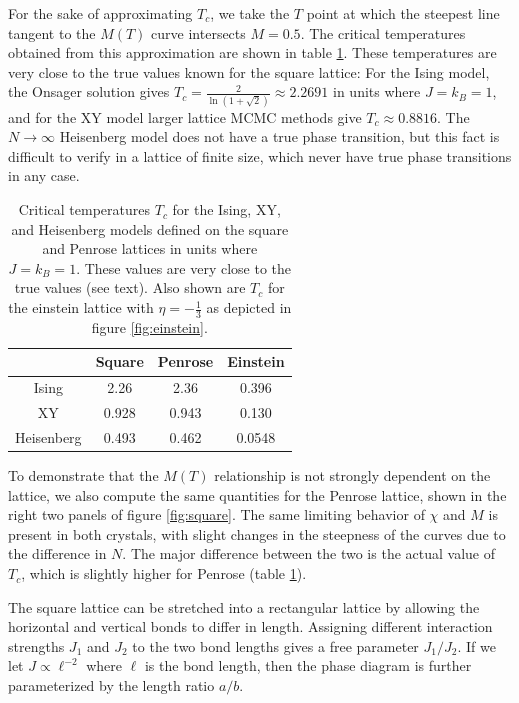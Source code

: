 \documentclass[
  amsmath,
  amssymb,
  aps,
  twocolumn,
  nofootinbib,
  nolongbibliography,
  floatfix,
]{revtex4-2}
\begin{document}
For the sake of approximating $T_c$, we take the $T$ point at which the steepest line tangent to the $M(T)$ curve intersects $M=0.5$. The critical temperatures obtained from this approximation are shown in table \ref{tab:tc}. These temperatures are very close to the true values known for the square lattice: For the Ising model, the Onsager solution gives $T_c = \frac{2}{\ln(1 + \sqrt{2})} \approx 2.2691$ in units where $J=k_B=1$, and for the XY model larger lattice MCMC methods give $T_c \approx 0.8816$. The $N\rightarrow \infty$ Heisenberg model does not have a true phase transition, but this fact is difficult to verify in a lattice of finite size, which never have true phase transitions in any case. 
\begin{table}
  \centering
  \begin{tabular}{c|ccc}
    \hline \hline
    & Square & Penrose & Einstein\\ \hline
    Ising & 2.26 & 2.36 & 0.396\\
    XY & 0.928 & 0.943 & 0.130\\
    Heisenberg & 0.493 & 0.462 & 0.0548\\ \hline \hline
  \end{tabular}
  \caption{Critical temperatures $T_c$ for the Ising, XY, and Heisenberg models defined on the square and Penrose lattices in units where $J = k_B = 1$. These values are very close to the true values (see text). Also shown are $T_c$ for the einstein lattice with $\eta=-\frac{1}{3}$ as depicted in figure \ref{fig:einstein}.}
  \label{tab:tc}
\end{table}

To demonstrate that the $M(T)$ relationship is not strongly dependent on the lattice, we also compute the same quantities for the Penrose lattice, shown in the right two panels of figure \ref{fig:square}. The same limiting behavior of $\chi$ and $M$ is present in both crystals, with slight changes in the steepness of the curves due to the difference in $N$. The major difference between the two is the actual value of $T_c$, which is slightly higher for Penrose (table \ref{tab:tc}).

The square lattice can be stretched into a rectangular lattice by allowing the horizontal and vertical bonds to differ in length. Assigning different interaction strengths $J_1$ and $J_2$ to the two bond lengths gives a free parameter $J_1/J_2$. If we let $J \propto \ell^{-2}$ where $\ell$ is the bond length, then the phase diagram is further parameterized by the length ratio $a/b$.
\end{document}
